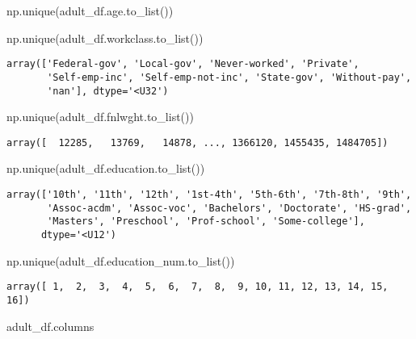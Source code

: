 \documentclass[
  letterpaper,
  DIV=11,
  numbers=noendperiod]{scrartcl}
\newenvironment{Shaded}{\begin{snugshade}}{\end{snugshade}}
\newcommand{\NormalTok}[1]{\textcolor[rgb]{0.00,0.23,0.31}{#1}}
\begin{document}
np.unique(adult\_df.age.to\_list())

\begin{Shaded}
\begin{Highlighting}[]
\NormalTok{np.unique(adult\_df.workclass.to\_list())}
\end{Highlighting}
\end{Shaded}

\begin{verbatim}
array(['Federal-gov', 'Local-gov', 'Never-worked', 'Private',
       'Self-emp-inc', 'Self-emp-not-inc', 'State-gov', 'Without-pay',
       'nan'], dtype='<U32')
\end{verbatim}

\begin{Shaded}
\begin{Highlighting}[]
\NormalTok{np.unique(adult\_df.fnlwght.to\_list())}
\end{Highlighting}
\end{Shaded}

\begin{verbatim}
array([  12285,   13769,   14878, ..., 1366120, 1455435, 1484705])
\end{verbatim}

\begin{Shaded}
\begin{Highlighting}[]
\NormalTok{np.unique(adult\_df.education.to\_list())}
\end{Highlighting}
\end{Shaded}

\begin{verbatim}
array(['10th', '11th', '12th', '1st-4th', '5th-6th', '7th-8th', '9th',
       'Assoc-acdm', 'Assoc-voc', 'Bachelors', 'Doctorate', 'HS-grad',
       'Masters', 'Preschool', 'Prof-school', 'Some-college'],
      dtype='<U12')
\end{verbatim}

\begin{Shaded}
\begin{Highlighting}[]
\NormalTok{np.unique(adult\_df.education\_num.to\_list())}
\end{Highlighting}
\end{Shaded}

\begin{verbatim}
array([ 1,  2,  3,  4,  5,  6,  7,  8,  9, 10, 11, 12, 13, 14, 15, 16])
\end{verbatim}

\begin{Shaded}
\begin{Highlighting}[]
\NormalTok{adult\_df.columns}
\end{Highlighting}
\end{Shaded}
\end{document}
